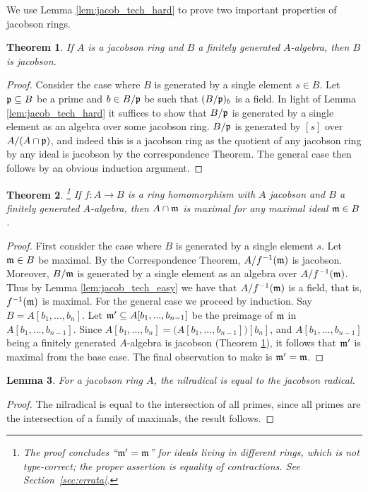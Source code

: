 \documentclass[12pt]{article}
\theoremstyle{plain}
\newtheorem{thm}{Theorem}[subsection] %
\newtheorem{lemma}[thm]{Lemma}
\theoremstyle{definition}
\begin{document}
We use Lemma \ref{lem:jacob_tech_hard} to prove two important properties of jacobson rings.
\begin{thm}\label{thm:fin_gen_jacob}
If $A$ is a jacobson ring and $B$ a finitely generated $A$-algebra, then $B$ is jacobson.
\end{thm}
\begin{proof}
Consider the case where $B$ is generated by a single element $s \in B$. Let $\frak{p} \subseteq B$ be a prime and $b \in B/\frak{p}$ be such that $(B/\frak{p})_b$ is a field. In light of Lemma \ref{lem:jacob_tech_hard} it suffices to show that $B/\frak{p}$ is generated by a single element as an algebra over some jacobson ring. $B/\frak{p}$ is generated by $[s]$ over $A/(A \cap \frak{p})$, and indeed this is a jacobson ring as the quotient of any jacobson ring by any ideal is jacobson by the correspondence Theorem. The general case then follows by an obvious induction argument.
\end{proof}
\begin{thm}\label{thm:jacob_preimage}\footnote{The proof concludes ``$\frak{m}'=\frak{m}$'' for ideals living in different rings, which is not type-correct; the proper assertion is equality of contractions. See Section~\ref{sec:errata}.}
If $f: A \to B$ is a ring homomorphism with $A$ jacobson and $B$ a finitely generated $A$-algebra, then $A \cap \frak{m}$ is maximal for any maximal ideal $\frak{m} \in B$.
\end{thm}
\begin{proof}
First consider the case where $B$ is generated by a single element $s$. Let $\frak{m} \in B$ be maximal. By the Correspondence Theorem, $A/f^{-1}(\frak{m})$ is jacobson. Moreover, $B/\frak{m}$ is generated by a single element as an algebra over $A/f^{-1}(\frak{m})$. Thus by Lemma \ref{lem:jacob_tech_easy} we have that $A/f^{-1}(\frak{m})$ is a field, that is, $f^{-1}(\frak{m})$ is maximal. For the general case we proceed by induction. Say $B = A[b_1,...,b_n]$. Let $\frak{m}' \subseteq A[b_1,...,b_{n-1}]$ be the preimage of $\frak{m}$ in $A[b_1,...,b_{n-1}]$. Since $A[b_1,...,b_{n}] = \big(A[b_1,...,b_{n-1}]\big)[b_n]$, and $A[b_1,...,b_{n-1}]$ being a finitely generated $A$-algebra is jacobson (Theorem \ref{thm:fin_gen_jacob}), it follows that $\frak{m}'$ is maximal from the base case. The final observation to make is $\frak{m}' = \frak{m}$.
\end{proof}
\begin{lemma}\label{lem:jacob_easy}
For a jacobson ring $A$, the nilradical is equal to the jacobson radical.
\end{lemma}
\begin{proof}
The nilradical is equal to the intersection of all primes, since all primes are the intersection of a family of maximals, the result follows.
\end{proof}
\end{document}
